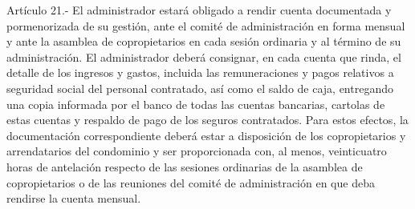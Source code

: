     Artículo 21.- El administrador estará obligado a rendir cuenta documentada y pormenorizada de su gestión, ante el comité de administración en forma mensual y ante la asamblea de copropietarios en cada sesión ordinaria y al término de su administración.
    El administrador deberá consignar, en cada cuenta que rinda, el detalle de los ingresos y gastos, incluida las remuneraciones y pagos relativos a seguridad social del personal contratado, así como el saldo de caja, entregando una copia informada por el banco de todas las cuentas bancarias, cartolas de estas cuentas y respaldo de pago de los seguros contratados.
    Para estos efectos, la documentación correspondiente deberá estar a disposición de los copropietarios y arrendatarios del condominio y ser proporcionada con, al menos, veinticuatro horas de antelación respecto de las sesiones ordinarias de la asamblea de copropietarios o de las reuniones del comité de administración en que deba rendirse la cuenta mensual.
     
